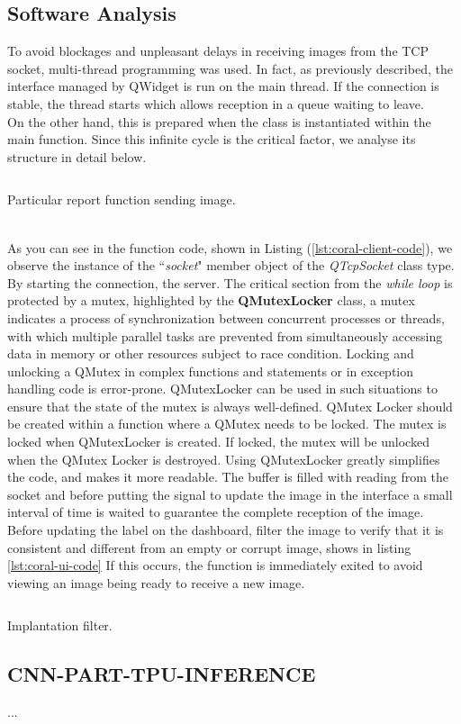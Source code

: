 \subsection{Software Analysis}
\label{ssec:software-coral-analysis}
To avoid blockages and unpleasant delays in receiving images from the TCP
socket, multi-thread programming was used. In fact, as previously described, the
interface managed by QWidget is run on the main thread. If the connection is
stable, the thread starts which allows reception in a queue waiting to leave.\\ 
On the other hand, this is prepared when the class is instantiated within the
main function. Since this infinite cycle is the critical factor, we analyse its
structure in detail below.
%
\begin{listing}[ht] 
\inputminted[bgcolor=bg,frame=lines,framesep=2mm, linenos=true, autogobble, breaklines=true, fontsize=\scriptsize, firstline=12, lastline=26]{c++}{software/code/streamerthread.cpp} 
\caption{Particular report function sending image.} 
\label{lst:coral-client-code} 
\end{listing}
%
\\As you can see in the function code, shown in Listing
(\ref{lst:coral-client-code}), we observe the instance of the ``\emph{socket}"
member object of the \emph{QTcpSocket} class type. By starting the connection,
the server. The critical section from the \emph{while loop} is protected by a
mutex, highlighted by the \textbf{QMutexLocker} class, a mutex indicates a
process of synchronization between concurrent processes or threads, with which
multiple parallel tasks are prevented from simultaneously accessing data in
memory or other resources subject to race condition.\cite{wiki:mutex} 
Locking and unlocking a QMutex in complex functions and statements or in
exception handling code is error-prone. 
QMutexLocker can be used in such situations to ensure that the state of the
mutex is always well-defined. QMutex Locker should be created within a function
where a QMutex needs to be locked. The mutex is locked when QMutexLocker is
created. If locked, the mutex will be unlocked when the QMutex Locker is
destroyed.
Using QMutexLocker greatly simplifies the code, and makes it more
readable.\cite{Qt:QMutexclass}
The buffer is filled with reading from the socket and before putting the signal
to update the image in the interface a small interval of time is waited to
guarantee the complete reception of the image.
Before updating the label on the dashboard, filter the image to verify that it
is consistent and different from an empty or corrupt image, shows in listing
\ref{lst:coral-ui-code} If this occurs, the function is immediately exited to
avoid viewing an image being ready to receive a new image. 
%
\begin{listing}[ht] 
\inputminted[bgcolor=bg,frame=lines,framesep=2mm, linenos=true, autogobble, breaklines=true, fontsize=\scriptsize, firstline=88, lastline=100]{c++}{software/code/tcpclient.cpp} 
\caption{Implantation filter.} 
\label{lst:coral-ui-code} 
\end{listing}
%
\subsection{CNN-PART-TPU-INFERENCE}
...
\newpage
